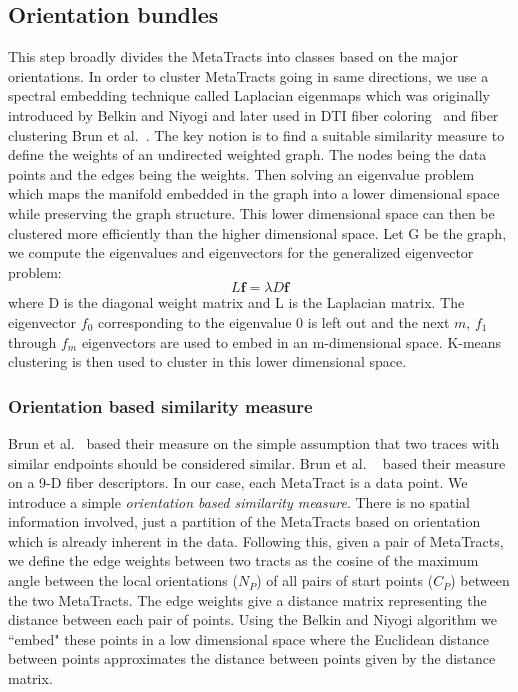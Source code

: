 \subsection {Orientation bundles}

This step broadly divides the MetaTracts into classes based on the major orientations.
In order to cluster MetaTracts going in same directions, we use a spectral embedding technique called Laplacian eigenmaps which was originally introduced by Belkin and Niyogi \cite{Belkin01} and later used in DTI fiber coloring~\cite{Brun2003} and fiber clustering Brun et al.~\cite{Brun2004}. The key notion is to find a suitable similarity measure to define the weights of an undirected weighted graph. The nodes being the data points and the edges being the weights. Then solving an eigenvalue problem which maps the manifold embedded in the graph into a lower dimensional space while preserving the graph structure.
This lower dimensional space can then be clustered more efficiently than the higher dimensional space. 
Let G be the graph, we compute the eigenvalues and eigenvectors for the generalized eigenvector problem:
\begin{equation}\label{equn:eigenMaps}
L\textbf{f}=\lambda D\textbf{f}
\end{equation}
where D is the diagonal weight matrix and L is the Laplacian matrix. The eigenvector \textbf{${f}_{0}$} corresponding to the eigenvalue 0 is left out and the next $m$, {\textbf{${f}_{1}$} through \textbf{${f}_{m}$}} eigenvectors are used to embed in an m-dimensional space. K-means clustering is then used to cluster in this lower dimensional space.


\subsubsection{Orientation based similarity measure}
\label{subsec:ori-sim-mes}
Brun et al.~\cite{Brun2003} based their measure on the simple assumption that two traces with similar endpoints should 
be considered similar. Brun et al. ~\cite{Brun2004} based their measure on a 9-D fiber descriptors.
In our case, each MetaTract is a data point. We introduce a simple \textit{orientation based similarity measure}. There is no spatial information involved, just a partition of the MetaTracts based on orientation which is already inherent in the data.
Following this, given a pair of  MetaTracts, we define the edge weights between two tracts as the cosine of the maximum angle between the local orientations ($N_P$) of all pairs of start points ($C_P$) between the two MetaTracts.
The edge weights give a distance matrix representing the distance between each pair of points.
Using the Belkin and Niyogi algorithm we ``embed" these points in a low dimensional space where the Euclidean distance between points approximates the distance between points given by the distance matrix.

